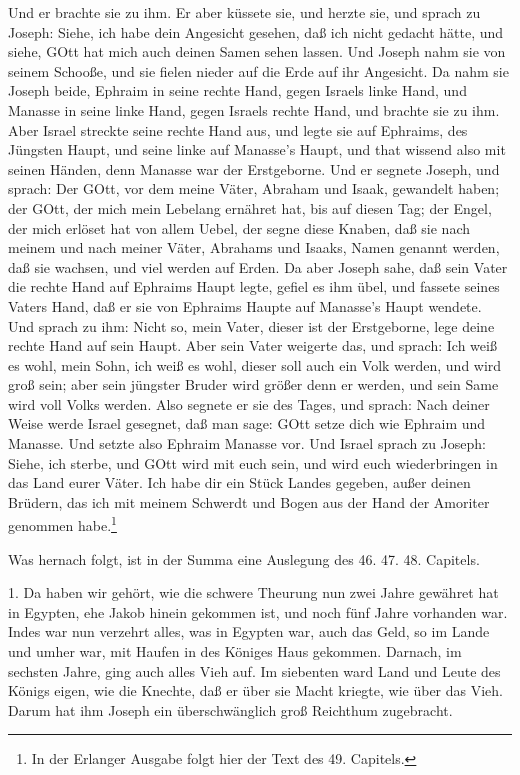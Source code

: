 Und er brachte sie zu ihm. Er aber küssete sie, und herzte sie, und sprach zu Joseph: Siehe, ich habe dein Angesicht gesehen, daß ich nicht gedacht hätte, und siehe, GOtt hat mich auch deinen Samen sehen lassen. Und Joseph nahm sie von seinem Schooße, und sie fielen nieder auf die Erde auf ihr Angesicht. Da nahm sie Joseph beide, Ephraim in seine rechte Hand, gegen Israels linke Hand, und Manasse in seine linke Hand, gegen Israels rechte Hand, und brachte sie zu ihm. Aber Israel streckte seine rechte Hand aus, und legte sie auf Ephraims, des Jüngsten Haupt, und seine linke auf Manasse’s Haupt, und that wissend also mit seinen Händen, denn Manasse war der Erstgeborne. Und er segnete Joseph, und sprach: Der GOtt, vor dem meine Väter, Abraham und Isaak, gewandelt haben; der GOtt, der mich mein Lebelang ernähret hat, bis auf diesen Tag; der Engel, der mich erlöset hat von allem Uebel, der segne diese Knaben, daß sie nach meinem und nach meiner Väter, Abrahams und Isaaks, Namen genannt werden, daß sie wachsen, und viel werden auf Erden. Da aber Joseph sahe, daß sein Vater die rechte Hand auf Ephraims Haupt legte, gefiel es ihm übel, und fassete seines Vaters Hand, daß er sie von Ephraims Haupte auf Manasse’s Haupt wendete. Und sprach zu ihm: Nicht so, mein Vater, dieser ist der Erstgeborne, lege deine rechte Hand auf sein Haupt. Aber sein Vater weigerte das, und sprach: Ich weiß es wohl, mein Sohn, ich weiß es wohl, dieser soll auch ein Volk werden, und wird groß sein; aber sein jüngster Bruder wird größer denn er werden, und sein Same wird voll Volks werden. Also segnete er sie des Tages, und sprach: Nach deiner Weise werde Israel gesegnet, daß man sage: GOtt setze dich wie Ephraim und Manasse. Und setzte also Ephraim Manasse vor. Und Israel sprach zu Joseph: Siehe, ich sterbe, und GOtt wird mit euch sein, und wird euch wiederbringen in das Land eurer Väter. Ich habe dir ein Stück Landes gegeben, außer deinen Brüdern, das ich mit meinem Schwerdt und Bogen aus der Hand der Amoriter genommen habe.\footnote{In der Erlanger Ausgabe folgt hier der Text des 49. Capitels.}

Was hernach folgt, ist in der Summa eine Auslegung des 46. 47. 48. Capitels.

1. Da haben wir gehört, wie die schwere Theurung nun zwei Jahre gewähret hat in Egypten, ehe Jakob hinein gekommen ist, und noch fünf Jahre vorhanden war. Indes war nun verzehrt alles, was in Egypten war, auch das Geld, so im Lande und umher war, mit Haufen in des Königes Haus gekommen. Darnach, im sechsten Jahre, ging auch alles Vieh auf. Im siebenten ward Land und Leute des Königs eigen, wie die Knechte, daß er über sie Macht kriegte, wie über das Vieh. Darum hat ihm Joseph ein überschwänglich groß Reichthum zugebracht.

